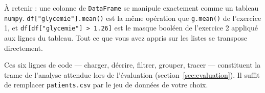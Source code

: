\documentclass[a4paper,12pt]{article}
\begin{document}
\begin{leftbar}
À retenir : une colonne de \texttt{DataFrame} se manipule exactement comme un tableau \texttt{numpy}. \texttt{df["glycemie"].mean()} est la même opération que \texttt{g.mean()} de l'exercice 1, et \texttt{df[df["glycemie"] > 1.26]} est le masque booléen de l'exercice 2 appliqué aux lignes du tableau. Tout ce que vous avez appris sur les listes se transpose directement.

Ces six lignes de code — charger, décrire, filtrer, grouper, tracer — constituent la trame de l'analyse attendue lors de l'évaluation (section~\ref{sec:evaluation}). Il suffit de remplacer \texttt{patients.csv} par le jeu de données de votre choix.
\end{leftbar}
\end{document}

